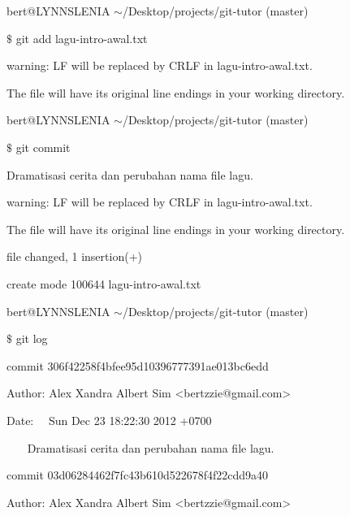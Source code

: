 {\fontsize{10pt}{10pt}\selectfont bert@LYNNSLENIA  $  \sim  $/Desktop/projects/git-tutor (master)} \par
{\fontsize{10pt}{10pt}\selectfont  $  \$  $ git add lagu-intro-awal.txt} \par
{\fontsize{10pt}{10pt}\selectfont warning: LF will be replaced by CRLF in lagu-intro-awal.txt.} \par
{\fontsize{10pt}{10pt}\selectfont The file will have its original line endings in your working directory.} \par
\vspace{10pt}
{\fontsize{10pt}{10pt}\selectfont bert@LYNNSLENIA  $  \sim  $/Desktop/projects/git-tutor (master)} \par
{\fontsize{10pt}{10pt}\selectfont  $  \$  $ git commit} \par
{\fontsize{10pt}{10pt}\selectfont [master 306f422] Dramatisasi cerita dan perubahan nama file lagu.} \par
{\fontsize{10pt}{10pt}\selectfont warning: LF will be replaced by CRLF in lagu-intro-awal.txt.} \par
{\fontsize{10pt}{10pt}\selectfont The file will have its original line endings in your working directory.} \par
{\fontsize{10pt}{10pt} file changed, 1 insertion(+)} \par
{\fontsize{10pt}{10pt}\selectfont  create mode 100644 lagu-intro-awal.txt} \par
\vspace{10pt}
{\fontsize{10pt}{10pt}\selectfont bert@LYNNSLENIA  $  \sim  $/Desktop/projects/git-tutor (master)} \par
{\fontsize{10pt}{10pt}\selectfont  $  \$  $ git log} \par
{\fontsize{10pt}{10pt}\selectfont commit 306f42258f4bfee95d10396777391ae013bc6edd} \par
{\fontsize{10pt}{10pt}\selectfont Author: Alex Xandra Albert Sim <bertzzie@gmail.com>} \par
{\fontsize{10pt}{10pt}\selectfont Date:~~ Sun Dec 23 18:22:30 2012 +0700} \par
\vspace{10pt}
{\fontsize{10pt}{10pt}\selectfont ~~~ Dramatisasi cerita dan perubahan nama file lagu.} \par
\vspace{10pt}
{\fontsize{10pt}{10pt}\selectfont commit 03d06284462f7fc43b610d522678f4f22cdd9a40} \par
{\fontsize{10pt}{10pt}\selectfont Author: Alex Xandra Albert Sim <bertzzie@gmail.com>} \par
